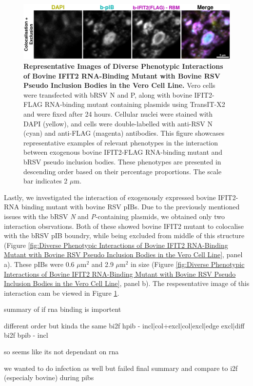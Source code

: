 \begin{figure}
    \centering
    \includegraphics[width=1\linewidth]{09. Chapter 4/Figs/01. pIB/03. IFIT2/05. IFIT2-RNA binding mutant/02. pIB/06. bi2f24-bnbp.pdf}
    \caption[Representative Images of Diverse Phenotypic Interactions of Bovine IFIT2 RNA-Binding Mutant with Bovine RSV Pseudo Inclusion Bodies in the Vero Cell Line.]{\textbf{Representative Images of Diverse Phenotypic Interactions of Bovine IFIT2 RNA-Binding Mutant with Bovine RSV Pseudo Inclusion Bodies in the Vero Cell Line.}  Vero cells were transfected with bRSV N and P, along with bovine IFIT2-FLAG RNA-binding mutant containing plasmids using TransIT-X2 and were fixed after 24 hours. Cellular nuclei were stained with DAPI (yellow), and cells were double-labelled with anti-RSV N (cyan) and anti-FLAG (magenta) antibodies. This figure showcases representative examples of relevant phenotypes in the interaction between exogenous bovine IFIT2-FLAG RNA-binding mutant and bRSV pseudo inclusion bodies. These phenotypes are presented in descending order based on their percentage proportions. The scale bar indicates 2 \(\mu \mbox{m}\).}
    \label{fig:Representative Images of Diverse Phenotypic Interactions of Bovine IFIT2 RNA-Binding Mutant with Bovine RSV Pseudo Inclusion Bodies in the Vero Cell Line}
\end{figure}

Lastly, we investigated the interaction of exogenously expressed bovine IFIT2-RNA binding mutant with bovine RSV pIBs. Due to the previously mentioned issues with the bRSV \textit{N} and \textit{P}-containing plasmids, we obtained only two interaction obsrvations. Both of these showed bovine IFIT2 mutant to colocalise with the bRSV pIB boundry, while being excluded from middle of this structure (Figure \ref{fig:Diverse Phenotypic Interactions of Bovine IFIT2 RNA-Binding Mutant with Bovine RSV Pseudo Inclusion Bodies in the Vero Cell Line}, panel a). These pIBs were 0.6 \(\mu \mbox{m}^2\) and 2.9 \(\mu \mbox{m}^2\) in size (Figure \ref{fig:Diverse Phenotypic Interactions of Bovine IFIT2 RNA-Binding Mutant with Bovine RSV Pseudo Inclusion Bodies in the Vero Cell Line}, panel b). The respesentative image of this interaction cam be viewed in Figure \ref{fig:Representative Images of Diverse Phenotypic Interactions of Bovine IFIT2 RNA-Binding Mutant with Bovine RSV Pseudo Inclusion Bodies in the Vero Cell Line}.

summary of if rna binding is importent

different order but kinda the same
bi2f hpib - incl|col+excl|col|excl|edge excl|diff
bi2f bpib - incl

so seems like its not dependant on rna

we wanted to do infection as well but failed
final summary and compare to i2f (especialy bovine) during pibs